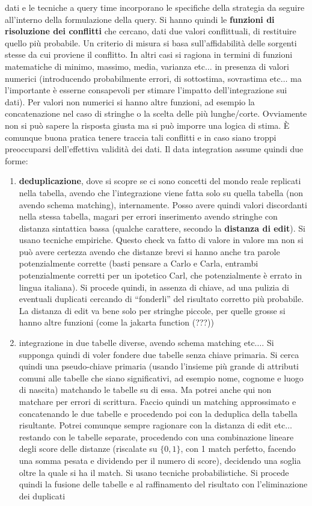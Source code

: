 \documentclass[a4paper,12pt, oneside]{book}
\begin{document}
dati e le tecniche a query time incorporano le specifiche della strategia da
seguire all'interno della formulazione della query. Si hanno quindi le
\textbf{funzioni di risoluzione dei conflitti} che cercano, dati due valori
conflittuali, di restituire quello più probabile. Un criterio di misura si basa
sull'affidabilità delle sorgenti stesse da cui proviene il conflitto. In altri
casi si ragiona in termini di funzioni matematiche di minimo, massimo, media,
varianza etc$\ldots$ in presenza di valori numerici (introducendo probabilmente
errori, di sottostima, sovrastima etc$\ldots$ ma l'importante è esserne
consapevoli per stimare l'impatto dell'integrazione sui dati). Per valori non
numerici si hanno altre funzioni, ad esempio la concatenazione nel caso di
stringhe o la scelta delle più lunghe/corte. Ovviamente non si può sapere la
risposta giusta ma si può imporre una logica di stima. È comunque buona pratica
tenere traccia tali conflitti e in caso siano troppi preoccuparsi dell'effettiva
validità dei dati. Il data integration assume quindi due forme:
\begin{enumerate}
  \item \textbf{deduplicazione}, dove si scopre se ci sono concetti del mondo
  reale replicati nella tabella, avendo che l'integrazione viene fatta solo su
  quella tabella (non avendo schema matching), internamente. Posso avere quindi
  valori discordanti nella stessa tabella, magari per errori inserimento
  avendo stringhe con distanza sintattica bassa (qualche carattere, secondo la
  \textbf{distanza di edit}). Si usano tecniche empiriche. Questo check va fatto
  di valore in valore ma non 
  si può avere certezza avendo che distanze brevi si hanno anche tra parole
  potenzialmente corrette (basti pensare a Carlo e Carla, entrambi
  potenzialmente corretti per un ipotetico Carl, che potenzialmente è errato in
  lingua italiana). Si procede quindi, in assenza di chiave, ad una pulizia di
  eventuali duplicati cercando di ``fonderli'' del risultato corretto più
  probabile. La distanza di edit va bene solo per stringhe piccole, per quelle
  grosse si hanno altre funzioni (come la jakarta function (???))
  \item integrazione in due tabelle diverse, avendo schema matching
  etc$\ldots$. Si supponga quindi di voler fondere due tabelle senza chiave
  primaria. Si cerca quindi una pseudo-chiave primaria (usando l'insieme più
  grande di attributi comuni alle tabelle che siano significativi, ad esempio
  nome, cognome e luogo di nascita) matchando le tabelle su di essa. Ma potrei
  anche qui non matchare per errori di scrittura. Faccio quindi un matching
  approssimato e concatenando le due tabelle e procedendo poi con la deduplica
  della tabella risultante. Potrei comunque sempre ragionare con la distanza di
  edit etc$\ldots$ restando con le tabelle separate, procedendo con una
  combinazione lineare degli score delle distanze (riscalate su $\{0,1\}$, con 1
  match perfetto, facendo una somma pesata e dividendo per il numero di score),
  decidendo una soglia oltre la quale si ha il match. Si usano tecniche
  probabilistiche. Si procede quindi la 
  fusione delle tabelle e al raffinamento del risultato con l'eliminazione dei
  duplicati 
\end{enumerate}
\end{document}
